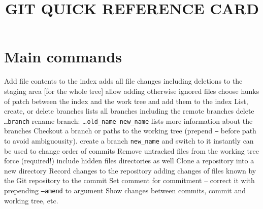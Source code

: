 
\def\cmdOptLl#1#2{
    \hsize=8.5cm
    \vbox {
        \hbox{
      \hskip 15pt
      \noindent\cmd{\tt--#1}
      \hfil
        }%
        \hskip 70pt  %
        \hbox to 5.9cm {%
            \hfuzz = 5pt
            \hfil
            \hsize=5.9cm
            \vtop{
                {#2}
            }}
    }%
    \par
    \vskip 0.14cm
}


\title{GIT QUICK REFERENCE CARD}

\shortintro

\section{Main commands}{}
	{Add file contents to the index}
	{adds all file changes including deletions to the staging area [for the whole tree]}
	{allow adding otherwise ignored files}
	{choose hunks of patch between the index and the work tree and add them to the index}
	{List, create, or delete branches}
	{lists all branches including the remote branches}
	{delete {\tt \dots branch}}
	{rename branch: \dots {\tt old\_name new\_name}}
	{lists more information about the branches}
	{Checkout a branch or paths to the working tree (prepend {\tt --} before path to avoid ambiguousity).}
	{create a branch {\tt new\_name} and switch to it instantly}
	{can be used to change order of commits}
	{Remove untracked files from the working tree}
	{force (required!)}
	{include hidden files}
	{directories as well}
	{Clone a repository into a new directory}
	{Record changes to the repository}
	{adding changes of files known by the Git repository to the commit}
	{Set comment for commitment -- correct it with prepending {\tt --amend} to argument}
	{Show changes between commits, commit and working tree, etc.}
